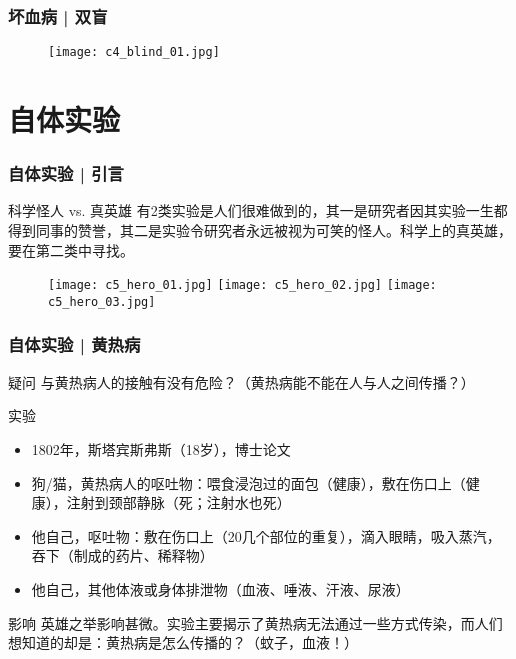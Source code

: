 \begin{frame}
  \frametitle{坏血病 | 双盲}
  \begin{figure}
    \centering
    \texttt{[image: c4\_blind\_01.jpg]}
  \end{figure}
\end{frame}

\section{自体实验}
\begin{frame}
  \frametitle{自体实验 | 引言}
  \begin{block}{科学怪人 vs. 真英雄}
    有2类实验是人们很难做到的，其一是研究者因其实验一生都得到同事的赞誉，其二是实验令研究者永远被视为可笑的怪人。科学上的真英雄，要在第二类中寻找。
  \end{block}
  \begin{figure}
    \centering
    \texttt{[image: c5\_hero\_01.jpg]}
    \texttt{[image: c5\_hero\_02.jpg]}
    \texttt{[image: c5\_hero\_03.jpg]}
  \end{figure}
\end{frame}

\begin{frame}
  \frametitle{自体实验 | 黄热病}
  \begin{block}{疑问}
    与黄热病人的接触有没有危险？（黄热病能不能在人与人之间传播？）
  \end{block}
  \pause
  \begin{block}{实验}
    \begin{itemize}
      \item 1802年，斯塔宾斯\textbullet 弗斯（18岁），博士论文
      \item 狗/猫，黄热病人的呕吐物：喂食浸泡过的面包（健康），敷在伤口上（健康），注射到颈部静脉（死；注射水也死）
      \item 他自己，呕吐物：敷在伤口上（20几个部位的重复），滴入眼睛，吸入蒸汽，吞下（制成的药片、稀释物）
      \item 他自己，其他体液或身体排泄物（血液、唾液、汗液、尿液）
    \end{itemize}
  \end{block}
  \pause
  \begin{block}{影响}
英雄之举影响甚微。实验主要揭示了黄热病无法通过一些方式传染，而人们想知道的却是：黄热病是怎么传播的？（蚊子，血液！）
  \end{block}
\end{frame}

